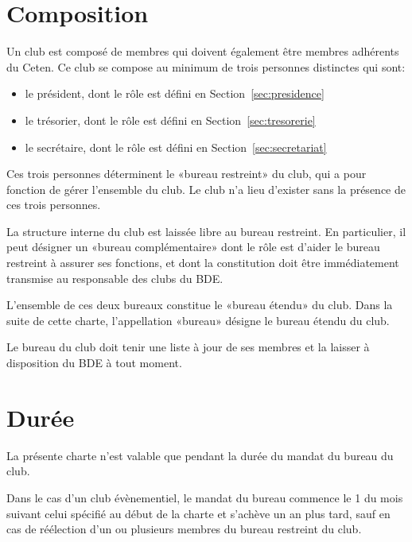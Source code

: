 \documentclass{article}
\begin{document}
\begin{multicols}{2}
{		}

		\section{Composition}
\label{sec:composition}

		{\small
		
			Un club est composé de membres qui doivent également être membres
			adhérents du Ceten. Ce club se compose au minimum de trois personnes
			distinctes qui sont:
			\begin{itemize}
				\item le président, dont le rôle est défini en
					Section~\ref{sec:presidence}
				\item le trésorier, dont le rôle est défini en
					Section~\ref{sec:tresorerie}
				\item le secrétaire, dont le rôle est défini en
					Section~\ref{sec:secretariat}
			\end{itemize}

			Ces trois personnes déterminent le «bureau restreint» du club, qui a
			pour fonction de gérer l'ensemble du club. Le club n'a lieu
			d'exister sans la présence de ces trois personnes.

			La structure interne du club est laissée libre au bureau restreint.
			En particulier, il peut désigner un «bureau complémentaire» dont le
			rôle est d'aider le bureau restreint à assurer ses fonctions, et
			dont la constitution doit être immédiatement transmise au
			responsable des clubs du BDE\@.

			L'ensemble de ces deux bureaux constitue le «bureau étendu» du club.
			Dans la suite de cette charte, l'appellation «bureau» désigne le
			bureau étendu du club.

			Le bureau du club doit tenir une liste à jour de ses membres et la
			laisser à disposition du BDE à tout moment.

		}

		\section{Durée}
\label{sec:duree}

		{\small
			
			La présente charte n'est valable que pendant la durée du mandat du
			bureau du club.

			Dans le cas d'un club évènementiel, le mandat du bureau commence le
			1 du mois suivant celui spécifié au début de la charte et
			s'achève un an plus tard, sauf en cas de réélection d'un ou
			plusieurs membres du bureau restreint du club.

}
\end{multicols}
\end{document}
